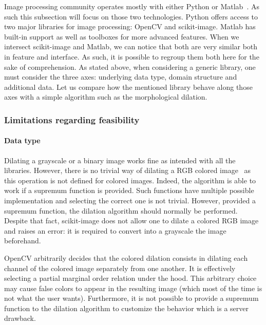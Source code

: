 Image processing community operates mostly with either Python or Matlab~\cite{etter.2002.introduction}. As such this
subsection will focus on those two technologies. Python offers access to two major libraries for image processing:
OpenCV and scikit-image. Matlab has built-in support as well as toolboxes for more advanced features. When we intersect
scikit-image and Matlab, we can notice that both are very similar both in feature and interface. As such, it is possible
to regroup them both here for the sake of comprehension. As stated above, when considering a generic library, one must
consider the three axes: underlying data type, domain structure and additional data. Let us compare how the mentioned
library behave along those axes with a simple algorithm such as the morphological dilation.

\subsubsection{Limitations regarding feasibility}

\paragraph{Data type} Dilating a grayscale or a binary image works fine as intended with all the libraries. However,
there is no trivial way of dilating a RGB colored image~\parencite{angulo.2007.morpho_color,dewitte.2005.morpho_color}
as this operation is not defined for colored images. Indeed, the algorithm is able to work if a supremum function is
provided. Such functions have multiple possible implementation and selecting the correct one is not trivial. However,
provided a supremum function, the dilation algorithm should normally be performed. Despite that fact, scikit-image does
not allow one to dilate a colored RGB image and raises an error: it is required to convert into a grayscale the image
beforehand.

OpenCV arbitrarily decides that the colored dilation consists in dilating each channel of the colored image separately
from one another. It is effectively selecting a partial marginal order relation under the hood. This arbitrary choice
may cause false colors to appear in the resulting image (which most of the time is not what the user wants).
Furthermore, it is not possible to provide a supremum function to the dilation algorithm to customize the behavior which
is a server drawback.

